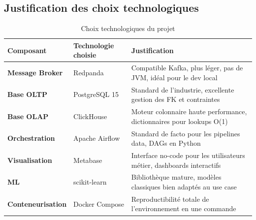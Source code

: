 \subsection{Justification des choix technologiques}

\begin{table}[H]
\centering
\begin{tabular}{>{\bfseries}p{3.5cm} p{4cm} p{6cm}}
\toprule
Composant & Technologie choisie & Justification \\
\midrule
Message Broker & Redpanda & Compatible Kafka, plus léger, pas de JVM, idéal pour le dev local \\
Base OLTP & PostgreSQL 15 & Standard de l'industrie, excellente gestion des FK et contraintes \\
Base OLAP & ClickHouse & Moteur colonnaire haute performance, dictionnaires pour lookups O(1) \\
Orchestration & Apache Airflow & Standard de facto pour les pipelines data, DAGs en Python \\
Visualisation & Metabase & Interface no-code pour les utilisateurs métier, dashboards interactifs \\
ML & scikit-learn & Bibliothèque mature, modèles classiques bien adaptés au use case \\
Conteneurisation & Docker Compose & Reproductibilité totale de l'environnement en une commande \\
\bottomrule
\end{tabular}
\caption{Choix technologiques du projet}
\end{table}
